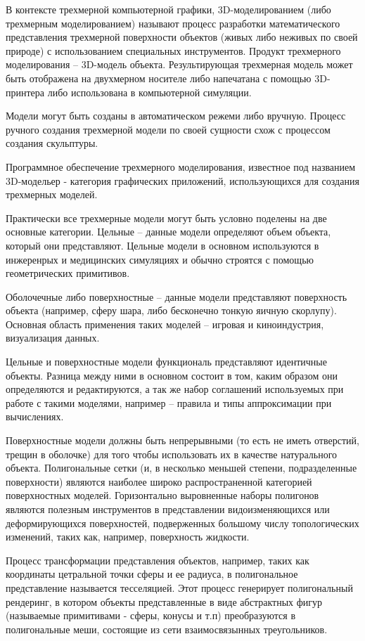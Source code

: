 В контексте трехмерной компьютерной графики, 3D-моделированием (либо трехмерным моделированием) называют процесс разработки
математического представления трехмерной поверхности объектов (живых либо неживых по своей природе) с использованием специальных
инструментов. Продукт трехмерного моделирования -- 3D-модель объекта. Результирующая трехмерная модель может быть отображена
на двухмерном носителе либо напечатана с помощью 3D-принтера либо использована в компьютерной симуляции.

Модели могут быть созданы в автоматическом режеми либо вручную. Процесс ручного создания трехмерной модели по своей сущности
схож с процессом создания скульптуры.

Программное обеспечение трехмерного моделирования, известное под названием 3D-модельер - категория графических приложений, использующихся для создания трехмерных
моделей.

Практически все трехмерные модели могут быть условно поделены на две основные категории.
Цельные -- данные модели определяют объем объекта, который они представляют. Цельные модели в основном используются в инжеренрых и медицинских симуляциях
и обычно строятся с помощью геометрических примитивов.\cite{solid_modelling}

Оболочечные либо поверхностные -- данные модели представляют поверхность объекта (например, сферу шара, либо бесконечно тонкую яичную скорлупу).
Основная область применения таких моделей -- игровая и киноиндустрия, визуализация данных.

Цельные и поверхностные модели функциональ представляют идентичные объекты. Разница между ними в основном состоит в том, каким образом они
определяются и редактируются, а так же набор соглашений используемых при работе с такими моделями, например -- правила и типы аппроксимации
при вычислениях. 

Поверхностные модели должны быть непрерывными (то есть не иметь отверстий, трещин в оболочке) для того чтобы использовать их в
качестве натурального объекта. Полигональные сетки (и, в несколько меньшей степени, подразделенные поверхности) являются наиболее широко распространенной
категорией поверхностных моделей. Горизонтально выровненные наборы полигонов являются полезным инструментов в представлении видоизменяющихся или
деформирующихся поверхностей, подверженных большому числу топологических изменений, таких как, например, поверхность жидкости.

Процесс трансформации представления объектов, например, таких как координаты цетральной точки сферы и ее радиуса, в полигональное представление называется тесселяцией.
Этот процесс генерирует полигональный рендеринг, в котором объекты представленные в виде абстрактных фигур (называемые примитивами - сферы, конусы и т.п) 
преобразуются в полигональные меши, состоящие из сети взаимосвязынных треугольников. 

